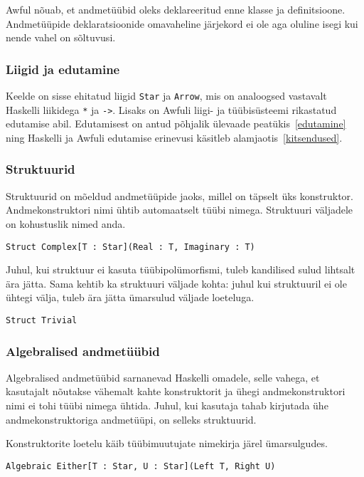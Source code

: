 \documentclass[12pt]{article}
\begin{document}
      Awful nõuab, et andmetüübid oleks deklareeritud enne klasse ja definitsioone. Andmetüüpide deklaratsioonide omavaheline järjekord ei ole aga oluline isegi kui nende vahel on sõltuvusi.
      \subsubsection{Liigid ja edutamine}
        Keelde on sisse ehitatud liigid \verb!Star! ja \verb!Arrow!, mis on analoogsed vastavalt Haskelli liikidega \verb!*! ja \verb!->!. Lisaks on Awfuli liigi- ja tüübisüsteemi rikastatud edutamise abil. Edutamisest on antud põhjalik ülevaade peatükis~\ref{edutamine} ning Haskelli ja Awfuli edutamise erinevusi käsitleb alamjaotis~\ref{kitsendused}.
      \subsubsection{Struktuurid}
        Struktuurid on mõeldud andmetüüpide jaoks, millel on täpselt üks konstruktor. Andmekonstruktori nimi ühtib automaatselt tüübi nimega. Struktuuri väljadele on kohustuslik nimed anda.

        \begin{verbatim}Struct Complex[T : Star](Real : T, Imaginary : T)\end{verbatim}

        Juhul, kui struktuur ei kasuta tüübipolümorfismi, tuleb kandilised sulud lihtsalt ära jätta. Sama kehtib ka struktuuri väljade kohta: juhul kui struktuuril ei ole ühtegi välja, tuleb ära jätta ümarsulud väljade loeteluga.

        \begin{verbatim}Struct Trivial\end{verbatim}

      \subsubsection{Algebralised andmetüübid}
        Algebralised andmetüübid sarnanevad Haskelli omadele, selle vahega, et kasutajalt nõutakse vähemalt kahte konstruktorit ja ühegi andmekonstruktori nimi ei tohi tüübi nimega ühtida. Juhul, kui kasutaja tahab kirjutada ühe andmekonstruktoriga andmetüüpi, on selleks struktuurid.

        Konstruktorite loetelu käib tüübimuutujate nimekirja järel ümarsulgudes.

        \begin{verbatim}Algebraic Either[T : Star, U : Star](Left T, Right U)\end{verbatim}
\end{document}
